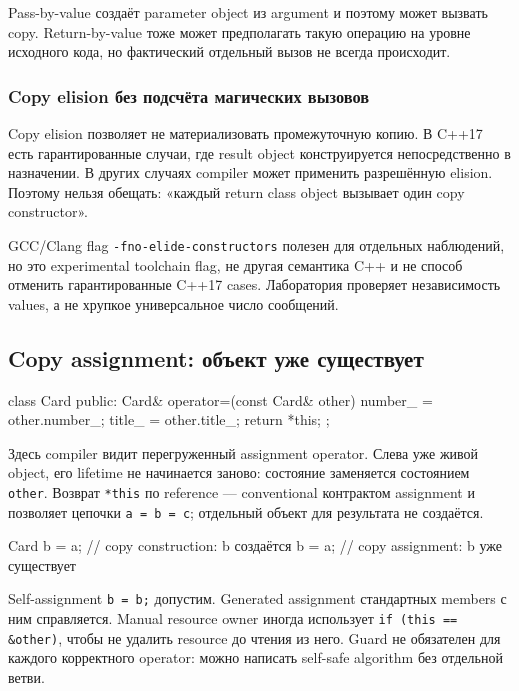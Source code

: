 Pass-by-value создаёт parameter object из argument и поэтому может вызвать
copy. Return-by-value тоже может предполагать такую операцию на уровне
исходного кода, но фактический отдельный вызов не всегда происходит.

\subsubsection{Copy elision без подсчёта магических вызовов}

Copy elision позволяет не материализовать промежуточную копию. В C++17 есть
гарантированные случаи, где result object конструируется непосредственно в
назначении. В других случаях compiler может применить разрешённую elision.
Поэтому нельзя обещать: «каждый return class object вызывает один copy
constructor».

GCC/Clang flag \texttt{-fno-elide-constructors} полезен для отдельных
наблюдений, но это experimental toolchain flag, не другая семантика C++ и не
способ отменить гарантированные C++17 cases. Лаборатория проверяет
независимость values, а не хрупкое универсальное число сообщений.

\subsection{Copy assignment: объект уже существует}

\begin{cppcode}
class Card {
public:
    Card& operator=(const Card& other) {
        number_ = other.number_;
        title_ = other.title_;
        return *this;
    }
};
\end{cppcode}

Здесь compiler видит перегруженный assignment operator. Слева уже живой
object, его lifetime не начинается заново: состояние заменяется состоянием
\texttt{other}. Возврат \texttt{*this} по reference --- conventional
контрактом assignment и позволяет цепочки \texttt{a = b = c}; отдельный
объект для результата не создаётся.

\begin{cppcode}
Card b = a; // copy construction: b создаётся
b = a;      // copy assignment: b уже существует
\end{cppcode}

Self-assignment \texttt{b = b;} допустим. Generated assignment стандартных
members с ним справляется. Manual resource owner иногда использует
\texttt{if (this == \&other)}, чтобы не удалить resource до чтения из него.
Guard не обязателен для каждого корректного operator: можно
написать self-safe algorithm без отдельной ветви.

